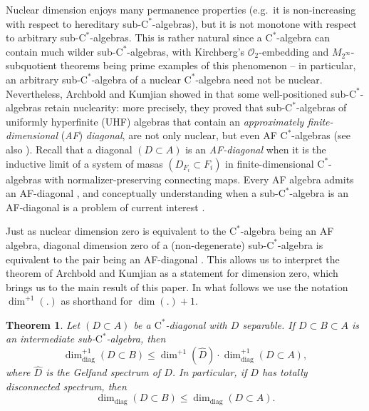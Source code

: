 \documentclass[11pt,a4paper]{amsart}
\newcounter{theoremintro}
\newtheorem{theoremi}[theoremintro]{Theorem}
\theoremstyle{definition}
\numberwithin{equation}{section}
\newcommand{\mc}[1]{\mathcal{#1}}
\begin{document}
Nuclear dimension enjoys many permanence properties (e.g.\ it is non-increasing with respect to hereditary sub-$\mathrm{C}^\ast$-algebras), but it is not monotone with respect to arbitrary sub-$\mathrm{C}^\ast$-algebras. This is rather natural since a $\mathrm{C}^\ast$-algebra can contain much wilder sub-$\mathrm{C}^\ast$-algebras, with Kirchberg's $\mc{O}_2$-embedding and $M_{2^\infty}$-subquotient theorems \cite[Theorem~IV.3.4.18]{Bla06} being prime examples of this phenomenon -- in particular, an arbitrary sub-$\mathrm{C}^\ast$-algebra of a nuclear $\mathrm{C}^\ast$-algebra need not be nuclear. Nevertheless, Archbold and Kumjian showed in \cite{ArcKum86} that some well-positioned sub-$\mathrm{C}^\ast$-algebras retain nuclearity: more precisely, they proved that sub-$\mathrm{C}^\ast$-algebras of uniformly hyperfinite (UHF) algebras that contain an \emph{approximately finite-dimensional} (\emph{AF}) \emph{diagonal}, are not only nuclear, but even AF $\mathrm{C}^\ast$-algebras (see also \cite{Archbold99}). Recall that a diagonal $(D\subset A)$ is an \emph{AF-diagonal} when it is the inductive limit of a system of masas $(D_{F_i}\subset F_i)$ in finite-dimensional $\mathrm{C}^\ast$-algebras with normalizer-preserving connecting maps. Every AF algebra admits an AF-diagonal \cite{StrVoi75}, and conceptually understanding when a sub-$\mathrm{C}^\ast$-algebra is an AF-diagonal is a problem of current interest \cite[Problem~XLVII]{SchTikWhi25}.

 Just as nuclear dimension zero is equivalent to the $\mathrm{C}^\ast$-algebra being an AF algebra, diagonal dimension zero of a (non-degenerate) sub-$\mathrm{C}^\ast$-algebra is equivalent to the pair being an AF-diagonal \cite[Theorem~4.1]{LiLiaWin23}. This allows us to interpret the theorem of Archbold and Kumjian as a statement for dimension zero, which brings us to the main result of this paper. In what follows we use the notation $\dim^{+1}(.)$ as shorthand for $\dim(.)+1$. 


\begin{theoremi}\label{thmi:A}
Let $(D\subset A)$ be a $\mathrm{C}^\ast$-diagonal with $D$ separable. If $D\subset B\subset A$ is an intermediate sub-$\mathrm{C}^\ast$-algebra, then
\[
\dim_{\mathrm{diag}}^{+1}(D\subset B)\le \dim^{+1}(\widehat{D})\cdot\dim^{+1}_\mathrm{diag}(D\subset A),
\]
where $\widehat{D}$ is the Gelfand spectrum of $D$. In particular, if $D$ has totally disconnected spectrum, then 
\[
\dim_\mathrm{diag}(D\subset B)\le \dim_\mathrm{diag}(D\subset A).
\]
\end{theoremi}
\end{document}

